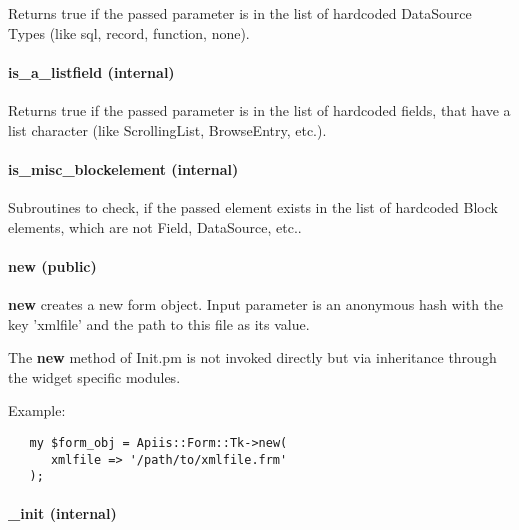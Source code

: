 Returns true if the passed parameter is in the list of hardcoded DataSource
Types (like sql, record, function, none).

\paragraph*{is\_a\_listfield (internal)\label{Apiis::Form::Init_--_base_package_for_Form_objects_of_all_types_is_a_listfield_internal_}}


Returns true if the passed parameter is in the list of hardcoded fields, that
have a list character (like ScrollingList, BrowseEntry, etc.).

\paragraph*{is\_misc\_blockelement (internal)\label{Apiis::Form::Init_--_base_package_for_Form_objects_of_all_types_is_misc_blockelement_internal_}}


Subroutines to check, if the passed element exists in the
list of hardcoded Block elements, which are not Field, DataSource, etc..

\paragraph*{new (public)\label{Apiis::Form::Init_--_base_package_for_Form_objects_of_all_types_new_public_}}


\textbf{new} creates a new form object.
Input parameter is an anonymous hash with the key 'xmlfile' and the path to this
file as its value.



The \textbf{new} method of Init.pm is not invoked directly but via inheritance through
the widget specific modules.



Example:

\begin{verbatim}
   my $form_obj = Apiis::Form::Tk->new(
      xmlfile => '/path/to/xmlfile.frm'
   );
\end{verbatim}
\paragraph*{\_init (internal)\label{Apiis::Form::Init_--_base_package_for_Form_objects_of_all_types__init_internal_}}


